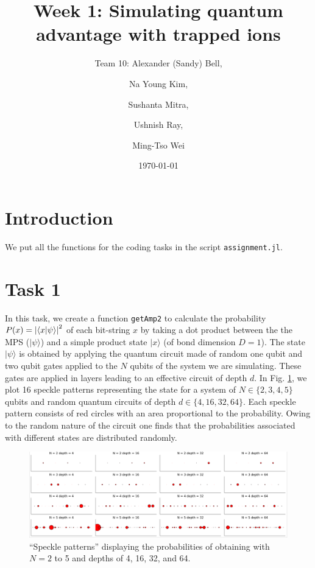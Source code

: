 \documentclass[12pt]{article}
\title{Week 1: Simulating quantum advantage with trapped ions}
\author{Team 10: Alexander (Sandy) Bell, 
\and Na Young Kim, 
\and Sushanta Mitra, 
\and Ushnish Ray, 
\and Ming-Tso Wei}
\date{\today}
\begin{document}
\maketitle



\section*{Introduction}

We put all the functions for the coding tasks in the script \texttt{assignment.jl}.



\section*{Task 1}

In this task, we create a function \texttt{getAmp2} to calculate the probability $P(x)= \abs{\ip{x}{\psi}}^2$ of each bit-string $x$ by taking a dot product between the the MPS ($|\psi\rangle$) and a simple product state $|x\rangle$
(of bond dimension $D = 1$). The state $|\psi\rangle$ is obtained by applying the quantum circuit made of random one qubit and two qubit gates applied to the $N$ qubits of the system we are simulating. These gates are applied in layers leading to an effective circuit of depth $d$. In Fig. \ref{fig:speckle}, we plot 16 speckle patterns representing the state for a system of $N \in \{2,3,4,5\}$ qubits and random quantum circuits of depth $d \in \{ 4, 16, 32, 64\}$. Each speckle pattern consists of red circles with an area proportional to the probability. Owing to the random nature of the circuit one finds that the probabilities associated with different states are distributed randomly.

\begin{figure}[bh]
	\centering
	\includegraphics [width=\linewidth] {figures/Task_1a}
	\caption{
		``Speckle patterns'' displaying the probabilities of obtaining with $N=2$ to 5 and depths of 4, 16, 32, and 64.
	}
	\label{fig:speckle}
\end{figure}
\end{document}
